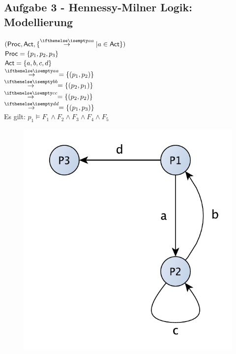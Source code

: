 \subsection*{Aufgabe 3 - Hennessy-Milner Logik: Modellierung}



$ (\Proc, \Act, \{ \CCSTrans{a} | a \in \Act \})$ \\
$ \operatorname{\sf Proc} = \{p_1, p_2, p_3 \}$ \\
$ \operatorname{\sf Act} = \{a, b, c, d\}$ \\
$ \CCSTrans{a} = \{ (p_1, p_2)\}$ \\
$ \CCSTrans{b} = \{ (p_2, p_1)\}$ \\
$ \CCSTrans{c} = \{ (p_2, p_2)\}$ \\
$ \CCSTrans{d} = \{ (p_1, p_3)\}$ \\

Es gilt:
$p_1 \models F_1 \land F_2 \land F_3 \land F_4 \land F_5$ \\

\begin{figure}[h!]
\begin{center}
\includegraphics[width=13cm]{aufgabe3-lts}
\end{center}
\end{figure}
